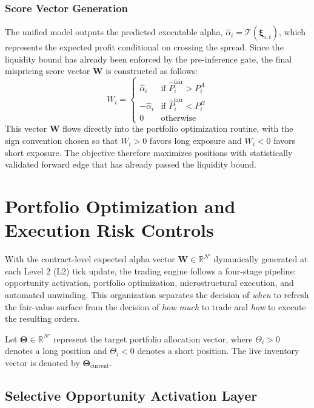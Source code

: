 \documentclass[11pt, a4paper]{article}
\begin{document}
\subsubsection{Score Vector Generation}
The unified model outputs the predicted executable alpha, $\hat{\alpha}_i = \mathcal{T}(\boldsymbol{\xi}_{i,t})$, which represents the expected profit conditional on crossing the spread. Since the liquidity bound has already been enforced by the pre-inference gate, the final mispricing score vector $\mathbf{W}$ is constructed as follows:
\begin{equation}
W_i = \begin{cases}
\hat{\alpha}_i & \text{if } \widehat{P}^{\mathrm{fair}}_i > P^{A}_i \\
-\hat{\alpha}_i & \text{if } \widehat{P}^{\mathrm{fair}}_i < P^{B}_i \\
0 & \text{otherwise}
\end{cases}
\end{equation}
This vector $\mathbf{W}$ flows directly into the portfolio optimization routine, with the sign convention chosen so that $W_i>0$ favors long exposure and $W_i<0$ favors short exposure. The objective therefore maximizes positions with statistically validated forward edge that has already passed the liquidity bound.


\section{Portfolio Optimization and Execution Risk Controls}

With the contract-level expected alpha vector $\mathbf{W} \in \mathbb{R}^{N'}$ dynamically generated at each Level 2 (L2) tick update, the trading engine follows a four-stage pipeline: opportunity activation, portfolio optimization, microstructural execution, and automated unwinding. This organization separates the decision of \emph{when} to refresh the fair-value surface from the decision of \emph{how much} to trade and \emph{how} to execute the resulting orders.

Let $\boldsymbol{\Theta} \in \mathbb{R}^{N'}$ represent the target portfolio allocation vector, where $\Theta_i > 0$ denotes a long position and $\Theta_i < 0$ denotes a short position. The live inventory vector is denoted by $\boldsymbol{\Theta}_{\text{current}}$.

\subsection{Selective Opportunity Activation Layer}
\label{subsec:activation-layer}
\end{document}
